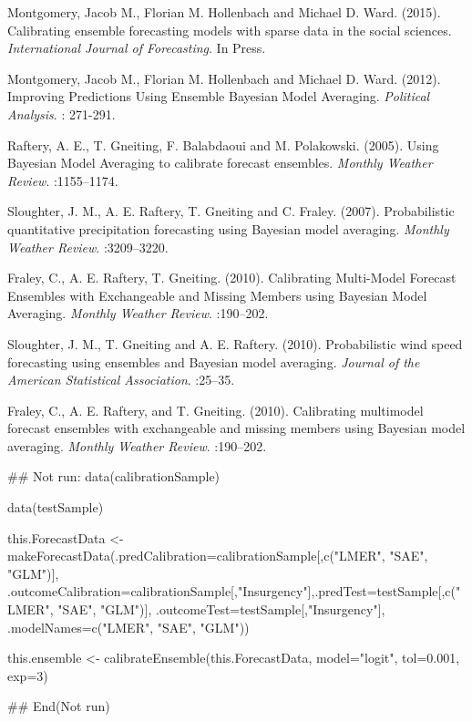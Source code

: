 \documentclass[a4paper]{book}
\begin{document}
%
\begin{References}\relax
Montgomery, Jacob M., Florian M. Hollenbach and Michael D. Ward. (2015). Calibrating ensemble forecasting models with sparse data in the social sciences.   \emph{International Journal of Forecasting}. In Press.

Montgomery, Jacob M., Florian M. Hollenbach and Michael D. Ward. (2012). Improving Predictions Using Ensemble Bayesian Model Averaging. \emph{Political Analysis}. : 271-291.

Raftery, A. E., T. Gneiting, F. Balabdaoui and M. Polakowski. (2005). Using Bayesian Model Averaging to calibrate forecast ensembles. \emph{Monthly Weather Review}. :1155--1174.

Sloughter, J. M., A. E. Raftery, T. Gneiting and C. Fraley. (2007). Probabilistic quantitative precipitation forecasting using Bayesian model averaging. \emph{Monthly Weather Review}. :3209--3220.

Fraley, C., A. E. Raftery, T. Gneiting. (2010). Calibrating Multi-Model Forecast Ensembles with Exchangeable and Missing Members using Bayesian Model Averaging. \emph{Monthly Weather Review}. :190--202.

Sloughter, J. M., T. Gneiting and A. E. Raftery. (2010). Probabilistic wind speed forecasting using ensembles and Bayesian model averaging. \emph{Journal of the American Statistical Association}. :25--35.

Fraley, C., A. E. Raftery, and T. Gneiting. (2010). Calibrating multimodel forecast ensembles with exchangeable and missing members using Bayesian model averaging. \emph{Monthly Weather Review}. :190--202.
\end{References}
%
\begin{Examples}
\begin{ExampleCode}
## Not run: data(calibrationSample)

data(testSample)

this.ForecastData <- makeForecastData(.predCalibration=calibrationSample[,c("LMER", "SAE", "GLM")],
.outcomeCalibration=calibrationSample[,"Insurgency"],.predTest=testSample[,c("LMER", "SAE", "GLM")],
.outcomeTest=testSample[,"Insurgency"], .modelNames=c("LMER", "SAE", "GLM"))

this.ensemble <- calibrateEnsemble(this.ForecastData, model="logit", tol=0.001, exp=3)

## End(Not run)
\end{ExampleCode}
\end{Examples}
\end{document}
